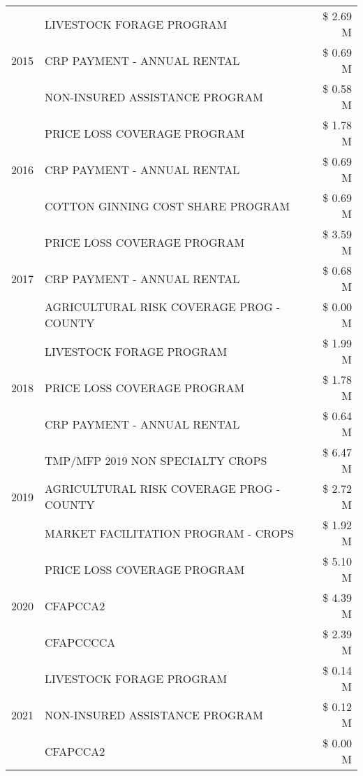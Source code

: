 \begin{tabular}{llr}
\multirow[t]{3}{*}{2015} & LIVESTOCK FORAGE PROGRAM & \$ 2.69 M \\
 & CRP PAYMENT - ANNUAL RENTAL & \$ 0.69 M \\
 & NON-INSURED ASSISTANCE PROGRAM & \$ 0.58 M \\
\cline{1-3}
\multirow[t]{3}{*}{2016} & PRICE LOSS COVERAGE PROGRAM & \$ 1.78 M \\
 & CRP PAYMENT - ANNUAL RENTAL & \$ 0.69 M \\
 & COTTON GINNING COST SHARE PROGRAM & \$ 0.69 M \\
\cline{1-3}
\multirow[t]{3}{*}{2017} & PRICE LOSS COVERAGE PROGRAM & \$ 3.59 M \\
 & CRP PAYMENT - ANNUAL RENTAL & \$ 0.68 M \\
 & AGRICULTURAL RISK COVERAGE PROG - COUNTY & \$ 0.00 M \\
\cline{1-3}
\multirow[t]{3}{*}{2018} & LIVESTOCK FORAGE PROGRAM & \$ 1.99 M \\
 & PRICE LOSS COVERAGE PROGRAM & \$ 1.78 M \\
 & CRP PAYMENT - ANNUAL RENTAL & \$ 0.64 M \\
\cline{1-3}
\multirow[t]{3}{*}{2019} & TMP/MFP 2019 NON SPECIALTY CROPS & \$ 6.47 M \\
 & AGRICULTURAL RISK COVERAGE PROG - COUNTY & \$ 2.72 M \\
 & MARKET FACILITATION PROGRAM - CROPS & \$ 1.92 M \\
\cline{1-3}
\multirow[t]{3}{*}{2020} & PRICE LOSS COVERAGE PROGRAM & \$ 5.10 M \\
 & CFAPCCA2 & \$ 4.39 M \\
 & CFAPCCCCA & \$ 2.39 M \\
\cline{1-3}
\multirow[t]{3}{*}{2021} & LIVESTOCK FORAGE PROGRAM & \$ 0.14 M \\
 & NON-INSURED ASSISTANCE PROGRAM & \$ 0.12 M \\
 & CFAPCCA2 & \$ 0.00 M \\
\cline{1-3}
\bottomrule
\end{tabular}
